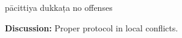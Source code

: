 \begin{exam}{\autoExamName}
\begin{problem}
    \bigskip

    \begin{answers}{3}
      \bChoices
       pācittiya\eAns
       dukkaṭa\eAns
       no offenses\eAns
      \eChoices
    \end{answers}

    \bigskip

    \textbf{Discussion:} Proper protocol in local conflicts.

  \end{problem}

\end{exam}
